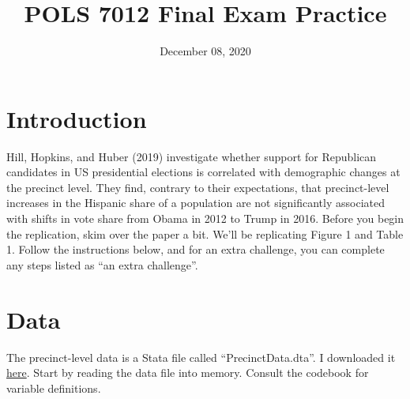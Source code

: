 \documentclass[12pt,halfline,a4paper,]{ouparticle}
\begin{document}
\title{POLS 7012 Final Exam Practice}

\author{%
\address{University of Georgia}
\and
{}\address{University of Georgia}
}


\date{December 08, 2020}

\keywords{}

\maketitle



\hypertarget{introduction}{%
\section{Introduction}\label{introduction}}

Hill, Hopkins, and Huber (2019) investigate whether support for
Republican candidates in US presidential elections is correlated with
demographic changes at the precinct level. They find, contrary to their
expectations, that precinct-level increases in the Hispanic share of a
population are not significantly associated with shifts in vote share
from Obama in 2012 to Trump in 2016. Before you begin the replication,
skim over the paper a bit. We'll be replicating Figure 1 and Table 1.
Follow the instructions below, and for an extra challenge, you can
complete any steps listed as ``an extra challenge''.

\hypertarget{data}{%
\section{Data}\label{data}}

The precinct-level data is a Stata file called ``PrecinctData.dta''. I
downloaded it
\href{https://dataverse.harvard.edu/dataset.xhtml?persistentId=doi:10.7910/DVN/J5GCZQ}{here}.
Start by reading the data file into memory. Consult the codebook for
variable definitions.
\end{document}
